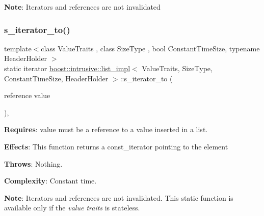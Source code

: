 {\bfseries Note}\+: Iterators and references are not invalidated \mbox{\label{classboost_1_1intrusive_1_1list__impl_aa6f586f577be78dc3acf107cd4b92d29}} 
\subsubsection{\texorpdfstring{s\+\_\+iterator\+\_\+to()}{s\_iterator\_to()}\hspace{0.1cm}{\footnotesize\ttfamily [1/2]}}
{\footnotesize\ttfamily template$<$class Value\+Traits , class Size\+Type , bool Constant\+Time\+Size, typename Header\+Holder $>$ \\
static iterator \hyperlink{classboost_1_1intrusive_1_1list__impl}{boost\+::intrusive\+::list\+\_\+impl}$<$ Value\+Traits, Size\+Type, Constant\+Time\+Size, Header\+Holder $>$\+::s\+\_\+iterator\+\_\+to (\begin{DoxyParamCaption}\item[{reference}]{value }\end{DoxyParamCaption})\hspace{0.3cm}{\ttfamily [inline]}, {\ttfamily [static]}}

{\bfseries Requires}\+: value must be a reference to a value inserted in a list.

{\bfseries Effects}\+: This function returns a const\+\_\+iterator pointing to the element

{\bfseries Throws}\+: Nothing.

{\bfseries Complexity}\+: Constant time.

{\bfseries Note}\+: Iterators and references are not invalidated. This static function is available only if the {\itshape value traits} is stateless. \mbox{\label{classboost_1_1intrusive_1_1list__impl_a649d0e05d1597b0b8054006cb3d217c3}} 
